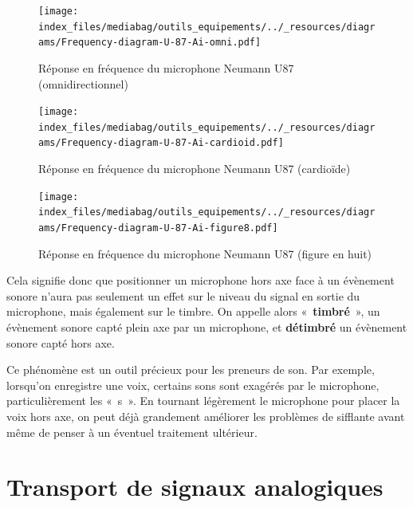 \documentclass[
  letterpaper,
  DIV=11,
  numbers=noendperiod]{scrreprt}
\begin{document}
\begin{figure}

{\centering \texttt{[image: index\_files/mediabag/outils\_equipements/../\_resources/diagrams/Frequency-diagram-U-87-Ai-omni.pdf]}

}

\caption{\label{fig-u87omni}Réponse en fréquence du microphone Neumann
U87 (omnidirectionnel)}

\end{figure}

\begin{figure}

{\centering \texttt{[image: index\_files/mediabag/outils\_equipements/../\_resources/diagrams/Frequency-diagram-U-87-Ai-cardioid.pdf]}

}

\caption{\label{fig-u87card}Réponse en fréquence du microphone Neumann
U87 (cardioïde)}

\end{figure}

\begin{figure}

{\centering \texttt{[image: index\_files/mediabag/outils\_equipements/../\_resources/diagrams/Frequency-diagram-U-87-Ai-figure8.pdf]}

}

\caption{\label{fig-u87bidir}Réponse en fréquence du microphone Neumann
U87 (figure en huit)}

\end{figure}

Cela signifie donc que positionner un microphone hors axe face à un
évènement sonore n'aura pas seulement un effet sur le niveau du signal
en sortie du microphone, mais également sur le timbre. On appelle alors
«~\textbf{timbré}~», un évènement sonore capté plein axe par un
microphone, et \textbf{détimbré} un évènement sonore capté hors axe.

Ce phénomène est un outil précieux pour les preneurs de son. Par
exemple, lorsqu'on enregistre une voix, certains sons sont exagérés par
le microphone, particulièrement les «~s~». En tournant légèrement le
microphone pour placer la voix hors axe, on peut déjà grandement
améliorer les problèmes de sifflante avant même de penser à un éventuel
traitement ultérieur.

\hypertarget{transport-de-signaux-analogiques}{%
\chapter{Transport de signaux
analogiques}\label{transport-de-signaux-analogiques}}
\end{document}

